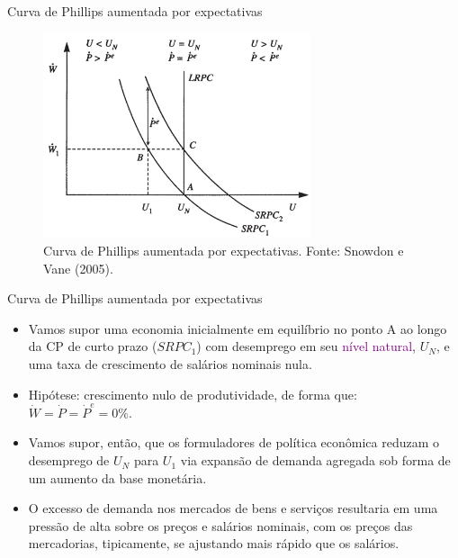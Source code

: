 \documentclass[10pt]{beamer}
\begin{document}
\begin{frame}{Curva de Phillips aumentada por expectativas}
    \begin{figure}
        \centering
        \includegraphics[width=0.7\textwidth]{./figures/aula10_fig11.PNG}
        \caption{Curva de Phillips aumentada por expectativas. Fonte: Snowdon e Vane (2005).}
        \label{fig11}
    \end{figure}
\end{frame}

\begin{frame}{Curva de Phillips aumentada por expectativas}
    \begin{itemize}
        \item Vamos supor uma economia inicialmente em equilíbrio no ponto A ao longo da CP de curto prazo ($SRPC_1$) com desemprego em seu \textcolor{purple}{nível natural}, $U_N$, e uma taxa de crescimento de salários nominais nula.
        \bigskip
        \item Hipótese: crescimento nulo de produtividade, de forma que: $\dot{W} = \dot{P} = \dot{P}^e = 0\%$.
        \bigskip
        \item Vamos supor, então, que os formuladores de política econômica reduzam o desemprego de $U_N$ para $U_1$ via expansão de demanda agregada sob forma de um aumento da base monetária.
        \bigskip
        \item O excesso de demanda nos mercados de bens e serviços resultaria em uma pressão de alta sobre os preços e salários nominais, com os preços das mercadorias, tipicamente, se ajustando mais rápido que os salários.
    \end{itemize}    
\end{frame}
\end{document}
